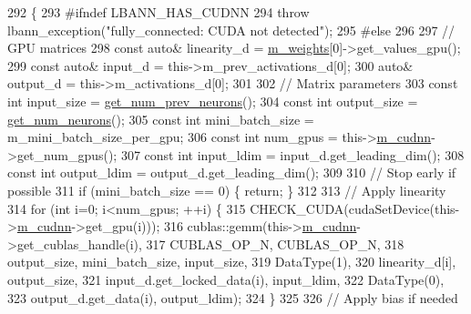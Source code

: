 \begin{DoxyCode}
292                          \{
293 \textcolor{preprocessor}{#ifndef LBANN\_HAS\_CUDNN}
294     \textcolor{keywordflow}{throw} lbann\_exception(\textcolor{stringliteral}{"fully\_connected: CUDA not detected"});
295 \textcolor{preprocessor}{#else}
296 
297     \textcolor{comment}{// GPU matrices}
298     \textcolor{keyword}{const} \textcolor{keyword}{auto}& linearity\_d = \hyperlink{classlbann_1_1Layer_a7954e30fbf9100a6ba4b56d02767a469}{m\_weights}[0]->get\_values\_gpu();
299     \textcolor{keyword}{const} \textcolor{keyword}{auto}& input\_d = this->m\_prev\_activations\_d[0];
300     \textcolor{keyword}{auto}& output\_d = this->m\_activations\_d[0];
301     
302     \textcolor{comment}{// Matrix parameters}
303     \textcolor{keyword}{const} \textcolor{keywordtype}{int} input\_size = \hyperlink{classlbann_1_1Layer_a27112eb70bbfbd7f3c3e749960400dec}{get\_num\_prev\_neurons}();
304     \textcolor{keyword}{const} \textcolor{keywordtype}{int} output\_size = \hyperlink{classlbann_1_1Layer_aa4de686cc6c2dd38166f42faf874f227}{get\_num\_neurons}();
305     \textcolor{keyword}{const} \textcolor{keywordtype}{int} mini\_batch\_size = m\_mini\_batch\_size\_per\_gpu;
306     \textcolor{keyword}{const} \textcolor{keywordtype}{int} num\_gpus = this->\hyperlink{classlbann_1_1Layer_a08dbb94239e3b8c96329786c57c72e21}{m\_cudnn}->get\_num\_gpus();
307     \textcolor{keyword}{const} \textcolor{keywordtype}{int} input\_ldim = input\_d.get\_leading\_dim();
308     \textcolor{keyword}{const} \textcolor{keywordtype}{int} output\_ldim = output\_d.get\_leading\_dim();
309 
310     \textcolor{comment}{// Stop early if possible}
311     \textcolor{keywordflow}{if} (mini\_batch\_size == 0) \{ \textcolor{keywordflow}{return}; \}
312 
313     \textcolor{comment}{// Apply linearity}
314     \textcolor{keywordflow}{for} (\textcolor{keywordtype}{int} i=0; i<num\_gpus; ++i) \{
315       CHECK\_CUDA(cudaSetDevice(this->\hyperlink{classlbann_1_1Layer_a08dbb94239e3b8c96329786c57c72e21}{m\_cudnn}->get\_gpu(i)));
316       cublas::gemm(this->\hyperlink{classlbann_1_1Layer_a08dbb94239e3b8c96329786c57c72e21}{m\_cudnn}->get\_cublas\_handle(i),
317                    CUBLAS\_OP\_N, CUBLAS\_OP\_N,
318                    output\_size, mini\_batch\_size, input\_size,
319                    DataType(1),
320                    linearity\_d[i], output\_size,
321                    input\_d.get\_locked\_data(i), input\_ldim,
322                    DataType(0),
323                    output\_d.get\_data(i), output\_ldim);
324     \}
325 
326     \textcolor{comment}{// Apply bias if needed}

\end{DoxyCode}
